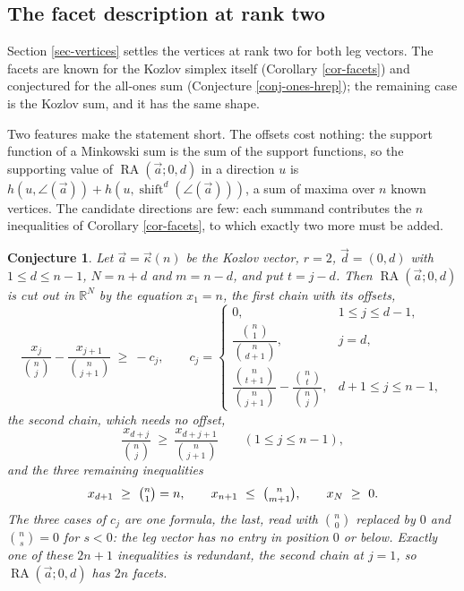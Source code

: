 \documentclass[11pt, a4paper, abstract=yes]{scrartcl}
\theoremstyle{definition}
\theoremstyle{remark}
\theoremstyle{plain}
\newtheorem{conjecture}[definition]{Conjecture}
\newcommand{\shift}{\operatorname{shift}}
\newcommand{\rasimp}{\angle}
\newcommand{\RA}{\operatorname{RA}}
\newcommand{\kozvec}{\vec\kappa}
\begin{document}
\subsection{The facet description at rank two}
\label{sec-hrep2}
Section \ref{sec-vertices} settles the vertices at rank two for both leg vectors. The facets are known
for the Kozlov simplex itself (Corollary \ref{cor-facets}) and conjectured for the all-ones sum
(Conjecture \ref{conj-ones-hrep}); the remaining case is the Kozlov sum, and it has the same shape.

Two features make the statement short. The offsets cost nothing: the support function of a Minkowski
sum is the sum of the support functions, so the supporting value of \(\RA(\vec a;0,d)\) in a
direction \(u\) is
\(h(u,\rasimp(\vec a))+h(u,\shift^d(\rasimp(\vec a)))\), a sum of maxima over \(n\) known vertices. The
candidate directions are few: each summand contributes the \(n\) inequalities of Corollary
\ref{cor-facets}, to which exactly two more must be added.

\begin{conjecture}
Let \(\vec a=\kozvec(n)\) be the Kozlov vector, \(r=2\), \(\vec d=(0,d)\) with \(1\le d\le n-1\),
\(N=n+d\) and \(m=n-d\), and put \(t=j-d\). Then \(\RA(\vec a;0,d)\) is cut out in \(\mathbb R^N\) by
the equation \(x_1=n\), the first chain with its offsets,
\begin{equation}\label{eq:kozlov-hrep2}
  \frac{x_j}{\binom nj}-\frac{x_{j+1}}{\binom n{j+1}}\ \ge\ -c_j,\qquad
  c_j=\begin{cases}
    0, & 1\le j\le d-1,\\[2pt]
    \dfrac{\binom n1}{\binom n{d+1}}, & j=d,\\[6pt]
    \dfrac{\binom n{t+1}}{\binom n{j+1}}-\dfrac{\binom nt}{\binom nj}, & d+1\le j\le n-1,
  \end{cases}
\end{equation}
the second chain, which needs no offset,
\begin{equation}\label{eq:kozlov-hrep2-second}
  \frac{x_{d+j}}{\binom nj}\ \ge\ \frac{x_{d+j+1}}{\binom n{j+1}}\qquad(1\le j\le n-1),
\end{equation}
and the three remaining inequalities
\begin{equation}\label{eq:kozlov-hrep2-extras}
  x_{d+1}\ \ge\ \tbinom n1=n,\qquad x_{n+1}\ \le\ \tbinom n{m+1},\qquad x_N\ \ge\ 0 .
\end{equation}
The three cases of \(c_j\) are one formula, the last, read with \(\binom n0\) replaced by \(0\) and
\(\binom ns=0\) for \(s<0\): the leg vector has no entry in position \(0\) or below. Exactly one of
these \(2n+1\) inequalities is redundant, the second chain at \(j=1\), so
\(\RA(\vec a;0,d)\) has
\(2n\) facets.
\label{conj:kozlov-hrep2}
\label{conj-kozlov-hrep2}
\end{conjecture}
\end{document}
